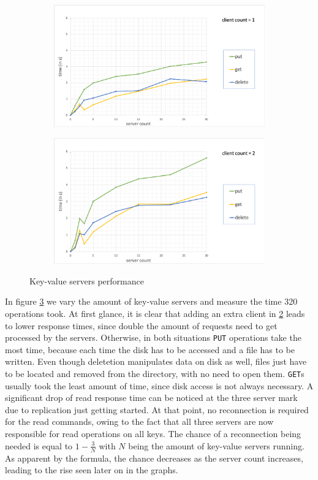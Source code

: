 \begin{figure}
	\begin{subfigure}[b]{\linewidth}
	\centering
	\includegraphics[width=0.8\linewidth]{figures/cc1.png}
\caption{}
\label{fig:perf_cc1}
	\end{subfigure}
	\begin{subfigure}[b]{\linewidth}
	\centering
	\includegraphics[width=0.8\linewidth]{figures/cc2.png}
\caption{}
\label{fig:perf_cc2}
	\end{subfigure}
\caption{Key-value servers performance}
\label{fig:perf_cc}
\end{figure}

In figure \ref{fig:perf_cc}  we vary the amount of key-value servers and measure the time 320 operations took. At first glance, it is clear that adding an extra client in \ref{fig:perf_cc2} leads to lower response times, since double the amount of requests need to get processed by the servers. Otherwise, in both situations \texttt{PUT} operations take the most time, because each time the disk has to be accessed and a file has to be written. Even though deletetion manipulates data on disk as well, files just have to be located and removed from the directory, with no need to open them. \texttt{GET}s usually took the least amount of time, since disk access is not always necessary. %
A significant drop of read response time can be noticed at the three server mark due to replication just getting started. At that point, no reconnection is required for the read commands, owing to the fact that all three servers are now responsible for read operations on all keys. The chance of a reconnection being needed is equal to \begin{math}1-\frac{3}{N}\end{math} with \begin{math}N\end{math} being the amount of key-value servers running. As apparent by the formula, the chance decreases as the server count increases, leading to the rise seen later on in the graphs. 


